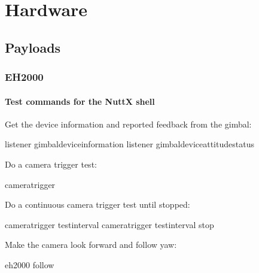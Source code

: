 \documentclass[letterpaper,10pt,english]{sphinxmanual}
\begin{document}
\chapter{Hardware}
\label{\detokenize{source/hardware:hardware}}\label{\detokenize{source/hardware::doc}}

\section{Payloads}
\label{\detokenize{source/hardware/payloads:payloads}}\label{\detokenize{source/hardware/payloads::doc}}

\subsection{EH2000}
\label{\detokenize{source/hardware/payloads/eh2000:eh2000}}\label{\detokenize{source/hardware/payloads/eh2000::doc}}

\subsubsection{Test commands for the NuttX shell}
\label{\detokenize{source/hardware/payloads/eh2000:test-commands-for-the-nuttx-shell}}
Get the device information and reported feedback from the gimbal:

\begin{sphinxVerbatim}[commandchars=\\\{\}]
listener gimbal\PYGZus{}device\PYGZus{}information
listener gimbal\PYGZus{}device\PYGZus{}attitude\PYGZus{}status
\end{sphinxVerbatim}

Do a camera trigger test:

\begin{sphinxVerbatim}[commandchars=\\\{\}]
camera\PYGZus{}trigger 
\end{sphinxVerbatim}

Do a continuous camera trigger test until stopped:

\begin{sphinxVerbatim}[commandchars=\\\{\}]
camera\PYGZus{}trigger test\PYGZus{}interval
camera\PYGZus{}trigger test\PYGZus{}interval stop
\end{sphinxVerbatim}

Make the camera look forward and follow yaw:

\begin{sphinxVerbatim}[commandchars=\\\{\}]
eh2000  follow
\end{sphinxVerbatim}
\end{document}
